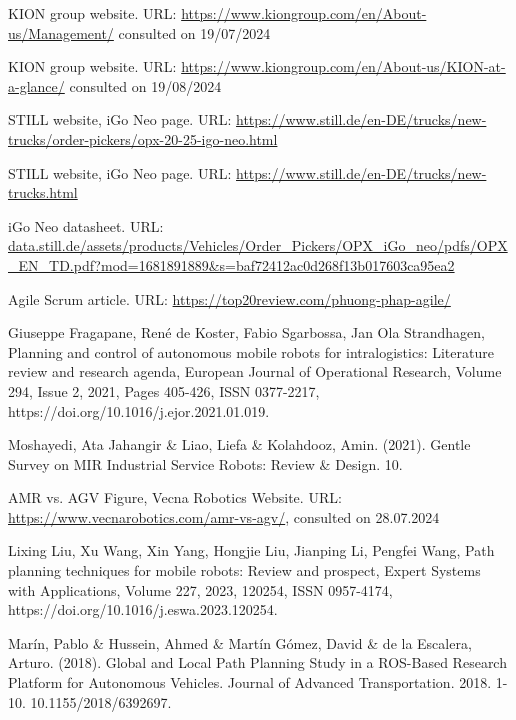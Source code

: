 
\renewcommand\bibname{Bibliography}

\begin{thebibliography}{9}
KION group website. URL: \url{https://www.kiongroup.com/en/About-us/Management/} consulted on 19/07/2024

KION group website. URL: \url{https://www.kiongroup.com/en/About-us/KION-at-a-glance/} consulted on 19/08/2024

STILL website, iGo Neo page. URL: \url{https://www.still.de/en-DE/trucks/new-trucks/order-pickers/opx-20-25-igo-neo.html}

STILL website, iGo Neo page. URL: \url{https://www.still.de/en-DE/trucks/new-trucks.html}

iGo Neo datasheet. URL: \url{data.still.de/assets/products/Vehicles/Order_Pickers/OPX_iGo_neo/pdfs/OPX_EN_TD.pdf?mod=1681891889&s=baf72412ac0d268f13b017603ca95ea2}

Agile Scrum article. URL: \url{https://top20review.com/phuong-phap-agile/}

Giuseppe Fragapane, René de Koster, Fabio Sgarbossa, Jan Ola Strandhagen,
Planning and control of autonomous mobile robots for intralogistics: Literature review 
and research agenda, European Journal of Operational Research, Volume 294, Issue 2, 2021,
Pages 405-426, ISSN 0377-2217, https://doi.org/10.1016/j.ejor.2021.01.019.

Moshayedi, Ata Jahangir \& Liao, Liefa \& Kolahdooz, Amin. (2021). 
Gentle Survey on MIR Industrial Service Robots: Review \& Design. 10. 

AMR vs. AGV Figure, Vecna Robotics Website. URL: \url{https://www.vecnarobotics.com/amr-vs-agv/}, 
consulted on 28.07.2024

Lixing Liu, Xu Wang, Xin Yang, Hongjie Liu, Jianping Li, Pengfei Wang,
Path planning techniques for mobile robots: Review and prospect,
Expert Systems with Applications, Volume 227, 2023, 120254, ISSN 0957-4174,
https://doi.org/10.1016/j.eswa.2023.120254.

Marín, Pablo \& Hussein, Ahmed \& Martín Gómez, David \& de la Escalera, Arturo. (2018). 
Global and Local Path Planning Study in a ROS-Based Research Platform for Autonomous Vehicles. 
Journal of Advanced Transportation. 2018. 1-10. 10.1155/2018/6392697. 


\end{thebibliography}
